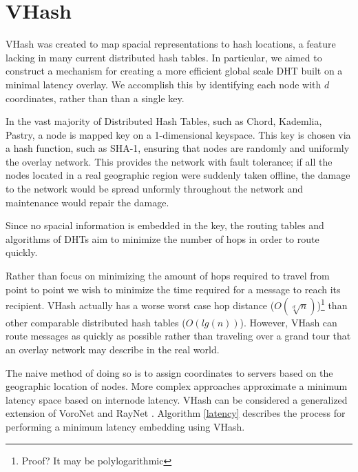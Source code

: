 \documentclass{IEEEtran}
\begin{document}
\section{VHash}

VHash was created to map spacial representations to hash locations, a feature lacking in many current distributed hash tables.  In particular, we aimed to construct a mechanism for creating a more efficient global scale DHT built on a minimal latency overlay.  We accomplish this by identifying each node with $d$ coordinates, rather than than a single key.  

In the vast majority of Distributed Hash Tables, such as Chord, Kademlia, Pastry, a node is mapped key on a 1-dimensional keyspace.  This key is chosen via a hash function, such as SHA-1, ensuring that nodes are randomly and uniformly the overlay network.  
This provides the network with fault tolerance; if all the nodes located in a real geographic region were suddenly taken offline, the damage to the network would be spread unformly throughout the network and maintenance would repair the damage.  

Since no spacial information is embedded in the key, the routing tables and algorithms of DHTs aim to minimize the number of hops in order to route quickly.

Rather than focus on minimizing the amount of hops required to travel from point to point we wish to minimize the time required for a message to reach its recipient. VHash actually has a worse worst case hop distance ($O(\sqrt[d]{n})$)\footnote{Proof? It may be polylogarithmic} than other comparable distributed hash tables ($O(lg(n))$). However, VHash can route messages as quickly as possible rather than traveling over a grand tour that an overlay network may describe in the real world.

The naive method of doing so is to assign coordinates to servers based on the geographic location of nodes. More complex approaches approximate a minimum latency space based on internode latency. VHash can be considered  a generalized extension of VoroNet \cite{voronet} and  RayNet \cite{raynet}.  Algorithm \ref{latency} describes the process for performing a minimum latency embedding using VHash.

\end{document}
